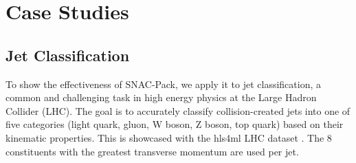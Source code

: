 \documentclass[11pt]{article}
\begin{document}







\section{Case Studies}
\label{sec:case-studies}

\subsection{Jet Classification}

To show the effectiveness of SNAC-Pack, we apply it to jet classification, a common and challenging task in high energy physics at the Large Hadron Collider (LHC).
The goal is to accurately classify collision-created jets into one of five categories (light quark, gluon, W boson, Z boson, top quark) based on their kinematic properties.
This is showcased with the hls4ml LHC dataset \cite{pierini_2020_3602260}.
The 8 constituents with the greatest transverse momentum are used per jet.
\end{document}
